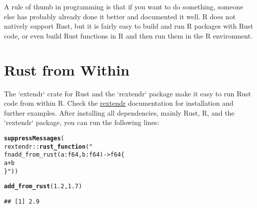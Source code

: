 \documentclass[twoside,twocolumn]{article}\usepackage[]{graphicx}\usepackage[dvipsnames]{xcolor}
\makeatletter
\newcommand{\hlnum}[1]{\textcolor[rgb]{0.686,0.059,0.569}{#1}}%
\newcommand{\hlstr}[1]{\textcolor[rgb]{0.192,0.494,0.8}{#1}}%
\newcommand{\hlopt}[1]{\textcolor[rgb]{0,0,0}{#1}}%
\newcommand{\hlstd}[1]{\textcolor[rgb]{0.345,0.345,0.345}{#1}}%
\newcommand{\hlkwd}[1]{\textcolor[rgb]{0.737,0.353,0.396}{\textbf{#1}}}%
\newenvironment{kframe}{%
 \def\at@end@of@kframe{}%
 \ifinner\ifhmode%
  \def\at@end@of@kframe{\end{minipage}}%
  \begin{minipage}{\columnwidth}%
 \fi\fi%
 \def\FrameCommand##1{\hskip\@totalleftmargin \hskip-\fboxsep
 \colorbox{shadecolor}{##1}\hskip-\fboxsep
     \hskip-\linewidth \hskip-\@totalleftmargin \hskip\columnwidth}%
 \MakeFramed {\advance\hsize-\width
   \@totalleftmargin\z@ \linewidth\hsize
   \@setminipage}}%
 {\par\unskip\endMakeFramed%
 \at@end@of@kframe}
\newenvironment{knitrout}{}{} %
\makeatother
\begin{document}


\label{sec:packages}
A rule of thumb in programming is that if you want to do something, someone else has probably already done it better and documented it well. R does not natively support Rust, but it is fairly easy to build and run R packages with Rust code, or even build Rust functions in R and then run them in the R environment.

\section*{Rust from Within}
The `extendr` crate for Rust and the `rextendr` package make it easy to run Rust code from within R. Check the \href{https://extendr.github.io/rextendr/}{rextendr} documentation for installation and further examples. After installing all dependencies, mainly Rust, R, and the `rextendr` package, you can run the following lines:
\begin{knitrout}
\color{fgcolor}\begin{kframe}
\begin{alltt}
\hlkwd{suppressMessages}\hlstd{(}
\hlstd{rextendr}\hlopt{::}\hlkwd{rust_function}\hlstd{(}\hlstr{"
fn add_from_rust(a:f64, b:f64) -> f64 \{
    a + b
\}"}\hlstd{))}

\hlkwd{add_from_rust}\hlstd{(}\hlnum{1.2}\hlstd{,} \hlnum{1.7}\hlstd{)}
\end{alltt}
\begin{verbatim}
## [1] 2.9
\end{verbatim}
\end{kframe}
\end{knitrout}
\end{document}
